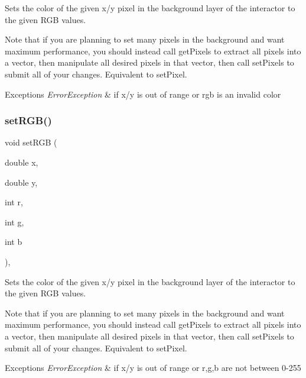Sets the color of the given x/y pixel in the background layer of the interactor to the given R\+GB values. 

Note that if you are planning to set many pixels in the background and want maximum performance, you should instead call get\+Pixels to extract all pixels into a vector, then manipulate all desired pixels in that vector, then call set\+Pixels to submit all of your changes. Equivalent to set\+Pixel.


\begin{DoxyExceptions}{Exceptions}
{\em Error\+Exception} & if x/y is out of range or rgb is an invalid color \\
\hline
\end{DoxyExceptions}
\mbox{\label{classsgl_1_1GDrawingSurface_a81202471d4fc9f2015aef0bc073acfab}} 
\subsubsection{\texorpdfstring{set\+R\+G\+B()}{setRGB()}\hspace{0.1cm}{\footnotesize\ttfamily [2/3]}}
{\footnotesize\ttfamily void set\+R\+GB (\begin{DoxyParamCaption}\item[{double}]{x,  }\item[{double}]{y,  }\item[{int}]{r,  }\item[{int}]{g,  }\item[{int}]{b }\end{DoxyParamCaption})\hspace{0.3cm}{\ttfamily [virtual]}, {\ttfamily [inherited]}}



Sets the color of the given x/y pixel in the background layer of the interactor to the given R\+GB values. 

Note that if you are planning to set many pixels in the background and want maximum performance, you should instead call get\+Pixels to extract all pixels into a vector, then manipulate all desired pixels in that vector, then call set\+Pixels to submit all of your changes. Equivalent to set\+Pixel.


\begin{DoxyExceptions}{Exceptions}
{\em Error\+Exception} & if x/y is out of range or r,g,b are not between 0-\/255 \\
\hline
\end{DoxyExceptions}
\mbox{\label{classsgl_1_1GDrawingSurface_ae9a228792d4bb4b628350f39eaa3ad12}} 
